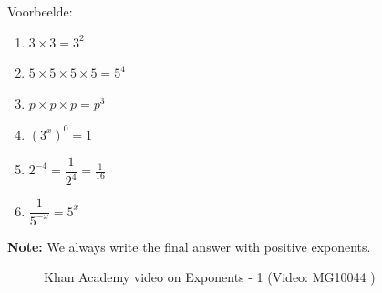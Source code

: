 Voorbeelde:
\begin{enumerate}[noitemsep, label=\textbf{\arabic*.}]
\item $3 \times 3 = 3^2$
\item $5 \times 5 \times 5 \times 5 = 5^4 $
\item $p \times p \times p = p^3$
\item $(3^x)^0 = 1$
\item $ 2^{-4} = \dfrac{1}{2^4} = \frac{1}{16}$
\item $ \dfrac{1}{5^{-x}} = 5^x$
\end{enumerate}

% 
% 
% 
% 
% 
% 
% 
      
\textbf{Note:} We always write the final answer with positive exponents.


% 
% 
% 
% 

\setcounter{subfigure}{0}
\begin{figure}[H] %
\textnormal{Khan Academy video on Exponents - 1}\vspace{.1in} 
\label{m38359*yt-media1}\label{m38359*yt-video1}
 { (Video:  MG10044 )}
\end{figure}       


